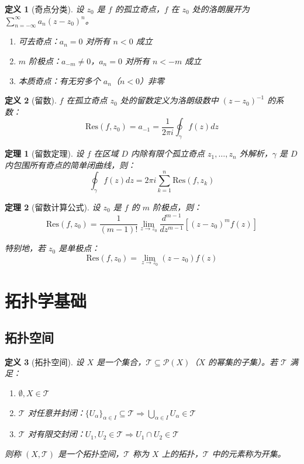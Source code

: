 \documentclass[12pt]{article}
\newtheorem{theorem}{定理}[section]
\newtheorem{definition}{定义}[section]
\begin{document}
\begin{definition}[奇点分类]
设 $z_0$ 是 $f$ 的孤立奇点，$f$ 在 $z_0$ 处的洛朗展开为 $\sum_{n=-\infty}^{\infty} a_n (z - z_0)^n$。

\begin{enumerate}
\item 可去奇点：$a_n = 0$ 对所有 $n < 0$ 成立
\item $m$ 阶极点：$a_{-m} \neq 0$，$a_n = 0$ 对所有 $n < -m$ 成立
\item 本质奇点：有无穷多个 $a_n$（$n < 0$）非零
\end{enumerate}
\end{definition}

\begin{definition}[留数]
$f$ 在孤立奇点 $z_0$ 处的留数定义为洛朗级数中 $(z - z_0)^{-1}$ 的系数：
$$\text{Res}(f, z_0) = a_{-1} = \frac{1}{2\pi i} \oint_\gamma f(z) dz$$
\end{definition}

\begin{theorem}[留数定理]
设 $f$ 在区域 $D$ 内除有限个孤立奇点 $z_1, \ldots, z_n$ 外解析，$\gamma$ 是 $D$ 内包围所有奇点的简单闭曲线，则：
$$\oint_\gamma f(z) dz = 2\pi i \sum_{k=1}^{n} \text{Res}(f, z_k)$$
\end{theorem}

\begin{theorem}[留数计算公式]
设 $z_0$ 是 $f$ 的 $m$ 阶极点，则：
$$\text{Res}(f, z_0) = \frac{1}{(m-1)!} \lim_{z \to z_0} \frac{d^{m-1}}{dz^{m-1}} [(z - z_0)^m f(z)]$$

特别地，若 $z_0$ 是单极点：
$$\text{Res}(f, z_0) = \lim_{z \to z_0} (z - z_0) f(z)$$
\end{theorem}


\section{拓扑学基础}

\subsection{拓扑空间}

\begin{definition}[拓扑空间]
设 $X$ 是一个集合，$\mathcal{T} \subseteq \mathcal{P}(X)$（$X$ 的幂集的子集）。若 $\mathcal{T}$ 满足：
\begin{enumerate}
\item $\emptyset, X \in \mathcal{T}$
\item $\mathcal{T}$ 对任意并封闭：$\{U_\alpha\}_{\alpha \in I} \subseteq \mathcal{T} \Rightarrow \bigcup_{\alpha \in I} U_\alpha \in \mathcal{T}$
\item $\mathcal{T}$ 对有限交封闭：$U_1, U_2 \in \mathcal{T} \Rightarrow U_1 \cap U_2 \in \mathcal{T}$
\end{enumerate}
则称 $(X, \mathcal{T})$ 是一个拓扑空间，$\mathcal{T}$ 称为 $X$ 上的拓扑，$\mathcal{T}$ 中的元素称为开集。
\end{definition}
\end{document}

